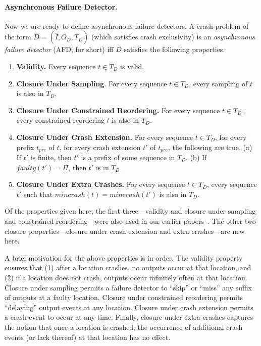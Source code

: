\documentclass[11pt]{article}
\numberwithin{theorem}{section}
\newcommand{\FD}{D}
\begin{document}
\paragraph{Asynchronous Failure Detector.}
Now we are ready to define asynchronous failure detectors.
A crash problem of the form $\FD = (\hat{I},O_{\FD},T_{\FD})$
(which satisfies crash exclusivity) is an \emph{asynchronous failure
  detector} (AFD, for short) iff $\FD$ satisfies the following
properties. 
\begin{enumerate}
\item \textbf{Validity.}
Every sequence $t \in T_{\FD}$ is valid.

\item \textbf{Closure Under Sampling}. For every sequence $t \in
  T_{\FD}$, every sampling of $t$ is also in $T_{\FD}$.

\item \textbf{Closure Under Constrained Reordering.} For every
  sequence $t \in T_{\FD}$, every constrained reordering $t$ is also
  in $T_{\FD}$. 

\item \textbf{Closure Under Crash Extension.} For every sequence $t
  \in T_{\FD}$, for every prefix $t_{pre}$ of $t$, for every crash
  extension $t'$ of $t_{pre}$, the following are true. (a) If $t'$ is finite, then $t'$ is a
  prefix of some sequence in $T_{\FD}$. (b) If $faulty(t') = \Pi$,
  then $t'$ is in $T_{\FD}$.

\item \textbf{Closure Under Extra Crashes.} 
For every sequence $t \in T_{\FD}$, every sequence $t'$ such that
$mincrash(t) = mincrash(t')$ is also in $T_{\FD}$.
\end{enumerate}

Of the properties given here, the first three---validity and closure
under sampling and constrained reordering---were also used in our
earlier papers~\cite{cornejoetalAFD,cornejoetalAFD-TR}.
The other two closure properties---closure under crash extension and
extra crashes---are new here.  

A brief motivation for the above properties is in order. The validity
property ensures that (1) after a location crashes, no outputs occur
at that location, and (2) if a location does not crash, outputs occur
infinitely often at that location. Closure under sampling permits a
failure detector to ``skip'' or ``miss'' any suffix of outputs at a faulty
location. Closure under constrained reordering permits ``delaying''
output events at any location. Closure under crash extension permits a
crash event to occur at any time. Finally, closure under extra crashes
captures the notion that once a location is crashed, the occurrence of
additional crash events (or lack thereof) at that location has no
effect.
\end{document}
